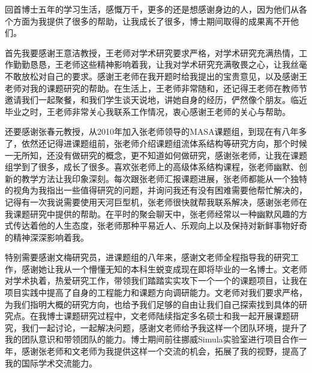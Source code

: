 

\begin{ack}
回首博士五年的学习生活，感慨万千，更多的还是想感谢身边的人，因为他们从各个方面为我提供了很多的帮助，让我成长了很多，博士期间取得的成果离不开他们。

首先我要感谢王意洁教授，王老师对学术研究要求严格，对学术研究充满热情，工作勤勤恳恳，王老师这些精神影响着我，让我对学术研究充满敬畏之心，让我丝毫不敢放松对自己的要求。感谢王老师在我开题时给我提出的宝贵意见，以及感谢王老师对我的课题研究的帮助。在生活上，王老师非常随和，还记得王老师在教师节邀请我们一起聚餐，和我们学生谈天说地，讲她自身的经历，俨然像个朋友。临近毕业之时，王老师非常关心我联系工作情况，衷心感谢王老师的关心与帮助。

还要感谢张春元教授，从2010年加入张老师领导的MASA课题组，到现在有八年多了，依然还记得进课题组前，张老师介绍课题组流体系结构等研究方向，那个时候一无所知，还没有做研究的概念，更不知道如何做研究，感谢张老师，让我在课题组学到了很多，成长了很多。喜欢张老师上的高级体系结构课程，张老师幽默、创新的教学方法让我印象深刻。每次跟张老师汇报课题进展，张老师都能从一个独特的视角为我指出一些值得研究的问题，并询问我还有没有困难需要他帮忙解决的，记得有一次我说需要使用天河巨型机，张老师很快就帮我联系解决，感谢张老师在我课题研究中提供的帮助。在平时的聚会聊天中，张老师经常以一种幽默风趣的方式传达着他的人生态度，张老师那种平易近人、乐观向上以及保持对新鲜事物好奇的精神深深影响着我。

特别需要感谢文梅研究员，进课题组的八年来，感谢文老师全程指导我的研究工作，感谢她让我从一个懵懂无知的本科生蜕变成现在即将毕业的一名博士。文老师对学术执着，热爱研究工作，带领我们踏踏实实攻下一个一个的课题项目，让我在项目实践中提高了自身的工程能力和课题方向调研能力。文老师对我们要求严格，为我们指明大概的研究方向，也给予我们足够的自由让我们自己探索找到具体的研究点。在我博士课题研究过程中，文老师陆续指定多名硕士和我一起开展课题研究，我们一起讨论，一起解决问题，感谢文老师给予我这样一个团队环境，提升了我的团队意识和带领团队的能力。博士期间前往挪威Simula实验室进行项目合作一年，感谢张老师和文老师为我提供这样一个交流的机会，拓展了我的视野，提高了我的国际学术交流能力。


\end{ack}
